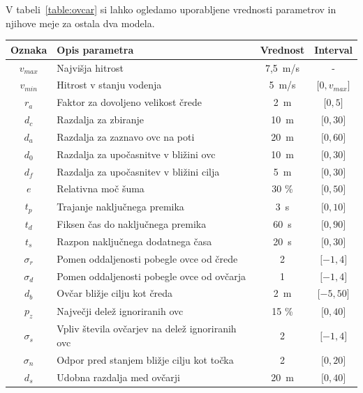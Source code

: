 V tabeli~\ref{table:ovcar} si lahko ogledamo uporabljene vrednosti parametrov in njihove meje za ostala dva modela.

\begin{table}[ht]
	\begin{center}
		\begin{tabular}{ c|l|c|c }
			\hline
			\textbf{Oznaka} & \textbf{Opis parametra} & \textbf{Vrednost} & \textbf{Interval} \\ \hline  
			$v_{max}$ & Najvišja hitrost & 7,5~m/s & - \\
			$v_{min}$ & Hitrost v stanju vodenja & 5~m/s & $\lbrack 0, v_{max} \rbrack$ \\
			$r_a$ & Faktor za dovoljeno velikost črede & 2~m & $\lbrack 0, 5 \rbrack$ \\
			$d_c$ & Razdalja za zbiranje & 10~m & $\lbrack 0, 30 \rbrack$ \\
			$d_a$ & Razdalja za zaznavo ovc na poti & 20~m & $\lbrack 0, 60 \rbrack$ \\
			$d_0$ & Razdalja za upočasnitve v bližini ovc & 10~m & $\lbrack 0, 30 \rbrack$ \\
			$d_f$ & Razdalja za upočasnitev v bližini cilja & 5~m & $\lbrack 0, 30 \rbrack$ \\
			$e$ & Relativna moč šuma & 30 \% & $\lbrack 0, 50 \rbrack$ \\
			$t_p$ & Trajanje naključnega premika & 3~s & $\lbrack 0, 10 \rbrack$ \\
			$t_d$ & Fiksen čas do naključnega premika & 60~s & $\lbrack 0, 90 \rbrack$ \\
			$t_s$ & Razpon naključnega dodatnega časa & 20~s & $\lbrack 0, 30 \rbrack$ \\
			$\sigma_r$ & Pomen oddaljenosti pobegle ovce od črede & 2 & $\lbrack -1, 4 \rbrack$ \\
			$\sigma_d$ & Pomen oddaljenosti pobegle ovce od ovčarja & 1 & $\lbrack -1, 4 \rbrack$ \\
			$d_b$ & Ovčar bližje cilju kot čreda & 2~m & $\lbrack -5, 50 \rbrack$ \\
			$p_z$ & Največji delež ignoriranih ovc & 15 \% & $\lbrack 0, 40 \rbrack$ \\
			$\sigma_s$ & Vpliv števila ovčarjev na delež ignoriranih ovc & 2 & $\lbrack -1, 4 \rbrack$ \\
			$\sigma_n$ & Odpor pred stanjem bližje cilju kot točka & 2 & $\lbrack 0, 20 \rbrack$ \\
			$d_s$ & Udobna razdalja med ovčarji & 20~m & $\lbrack 0, 40 \rbrack$ \\

\end{tabular}
\end{center}
\end{table}
